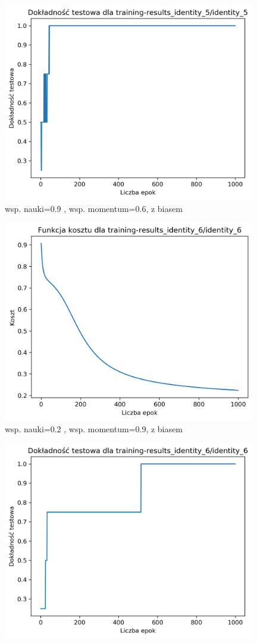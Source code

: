 \documentclass{classrep}
\begin{document}
{{\begin{figure}[!htbp]
                \includegraphics[width=110mm]{wykresy/identity_5_testing-accuracy.png}
                \caption{wsp. nauki=0.9 , wsp. momentum=0.6, z biasem}
            \end{figure}
            \FloatBarrier
            \begin{figure}[!htbp]
                \centering
                \includegraphics[width=110mm]{wykresy/identity_6_cost.png}
                \caption{wsp. nauki=0.2 , wsp. momentum=0.9, z biasem}
            \end{figure}
            \begin{figure}[!htbp]
                \centering
                \includegraphics[width=110mm]{wykresy/identity_6_testing-accuracy.png}

\end{figure}}}
\end{document}
